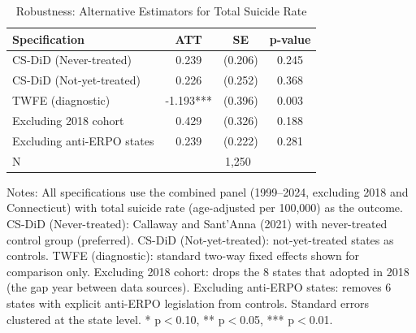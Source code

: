 \begin{table}[H]
\centering
\caption{Robustness: Alternative Estimators for Total Suicide Rate}
\label{tab:robustness}
\begin{threeparttable}
\begin{tabular}{lccc}
\toprule
Specification & ATT & SE & p-value \\
\midrule
CS-DiD (Never-treated) & 0.239 & (0.206) & 0.245 \\
CS-DiD (Not-yet-treated) & 0.226 & (0.252) & 0.368 \\
TWFE (diagnostic) & -1.193*** & (0.396) & 0.003 \\
Excluding 2018 cohort & 0.429 & (0.326) & 0.188 \\
Excluding anti-ERPO states & 0.239 & (0.222) & 0.281 \\
\addlinespace
N & \multicolumn{3}{c}{1,250} \\
\bottomrule
\end{tabular}
\begin{tablenotes}[flushleft]
\small
\item Notes: All specifications use the combined panel (1999--2024, excluding 2018 and Connecticut) with total suicide rate (age-adjusted per 100,000) as the outcome. CS-DiD (Never-treated): Callaway and Sant'Anna (2021) with never-treated control group (preferred). CS-DiD (Not-yet-treated): not-yet-treated states as controls. TWFE (diagnostic): standard two-way fixed effects shown for comparison only. Excluding 2018 cohort: drops the 8 states that adopted in 2018 (the gap year between data sources). Excluding anti-ERPO states: removes 6 states with explicit anti-ERPO legislation from controls. Standard errors clustered at the state level. * p$<$0.10, ** p$<$0.05, *** p$<$0.01.
\end{tablenotes}
\end{threeparttable}
\end{table}
